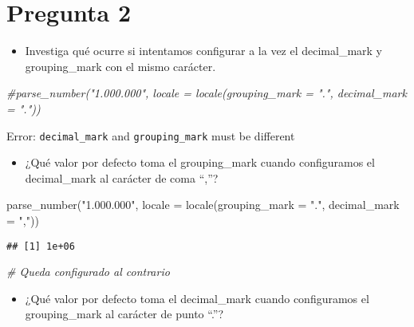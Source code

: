 \documentclass[
]{article}
\newenvironment{Shaded}{\begin{snugshade}}{\end{snugshade}}
\newcommand{\AttributeTok}[1]{\textcolor[rgb]{0.77,0.63,0.00}{#1}}
\newcommand{\CommentTok}[1]{\textcolor[rgb]{0.56,0.35,0.01}{\textit{#1}}}
\newcommand{\FunctionTok}[1]{\textcolor[rgb]{0.00,0.00,0.00}{#1}}
\newcommand{\NormalTok}[1]{#1}
\newcommand{\StringTok}[1]{\textcolor[rgb]{0.31,0.60,0.02}{#1}}
\providecommand{\tightlist}{%
  \setlength{\itemsep}{0pt}\setlength{\parskip}{0pt}}
\begin{document}
\hypertarget{pregunta-2}{%
\section{Pregunta 2}\label{pregunta-2}}

\begin{itemize}
\tightlist
\item
  Investiga qué ocurre si intentamos configurar a la vez el
  decimal\_mark y grouping\_mark con el mismo carácter.
\end{itemize}

\begin{Shaded}
\begin{Highlighting}[]
\CommentTok{\#parse\_number("1.000.000", locale = locale(grouping\_mark = ".", decimal\_mark = "."))}
\end{Highlighting}
\end{Shaded}

Error: \texttt{decimal\_mark} and \texttt{grouping\_mark} must be
different

\begin{itemize}
\tightlist
\item
  ¿Qué valor por defecto toma el grouping\_mark cuando configuramos el
  decimal\_mark al carácter de coma ``,''?
\end{itemize}

\begin{Shaded}
\begin{Highlighting}[]
\FunctionTok{parse\_number}\NormalTok{(}\StringTok{"1.000.000"}\NormalTok{, }\AttributeTok{locale =} \FunctionTok{locale}\NormalTok{(}\AttributeTok{grouping\_mark =} \StringTok{"."}\NormalTok{, }\AttributeTok{decimal\_mark =} \StringTok{","}\NormalTok{))}
\end{Highlighting}
\end{Shaded}

\begin{verbatim}
## [1] 1e+06
\end{verbatim}

\begin{Shaded}
\begin{Highlighting}[]
\CommentTok{\# Queda configurado al contrario }
\end{Highlighting}
\end{Shaded}

\begin{itemize}
\tightlist
\item
  ¿Qué valor por defecto toma el decimal\_mark cuando configuramos el
  grouping\_mark al carácter de punto ``.''?
\end{itemize}
\end{document}
